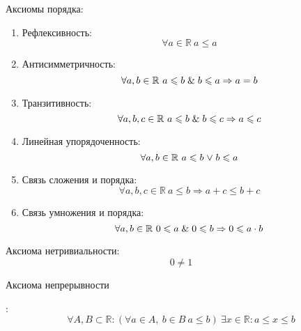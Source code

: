 Аксиомы порядка:
\begin{enumerate}
	\item Рефлексивность:
	\begin{equation*}
	\forall a \in \mathbb R \
	a \leqslant a
	\end{equation*}
	
	\item Антисимметричность:
	\begin{equation*}
	\forall a, b \in \mathbb R \
	a \leqslant b \mathrel{\&} b \leqslant a \Rightarrow a = b
	\end{equation*}
	
	\item Транзитивность:
	\begin{equation*}
	\forall a, b, c \in \mathbb R \
	a \leqslant b \mathrel{\&} b \leqslant c \Rightarrow a \leqslant c
	\end{equation*}
	
	\item Линейная упорядоченность:
	\begin{equation*}
	\forall a, b \in \mathbb R \
	a \leqslant b \mathrel{\lor} b \leqslant a
	\end{equation*}
	
	\item Связь сложения и порядка:
	\begin{equation*}
	\forall a, b, c \in \mathbb R \
	a \leqslant b \Rightarrow a + c \leqslant b + c
	\end{equation*}
	
	\item Связь умножения и порядка:
	\begin{equation*}
	\forall a, b \in \mathbb R \
	0 \leqslant a \mathrel{\&} 0 \leqslant b \Rightarrow 0 \leqslant a \cdot b
	\end{equation*}
\end{enumerate}

Аксиома нетривиальности:
\begin{equation*}
0 \neq 1
\end{equation*}

\hypertarget{eq:continuity_axiom}{Аксиома непрерывности}:
\begin{equation*}
\forall A, B \subset \mathbb R \colon
(\forall a \in A, \ b \in B \ a \leqslant b) \
\exists x \in \mathbb R \colon
a \leqslant x \leqslant b
\end{equation*}